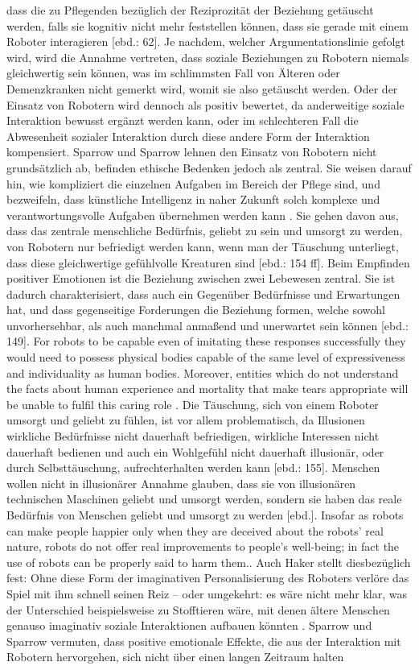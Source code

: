 dass die zu Pflegenden bezüglich der Reziprozität der Beziehung getäuscht werden, falls sie kognitiv nicht mehr feststellen können, dass sie gerade mit einem Roboter interagieren [ebd.: 62]. Je nachdem, welcher Argumentationslinie gefolgt wird, wird die Annahme vertreten, dass soziale Beziehungen zu Robotern niemals gleichwertig sein können, was im schlimmsten Fall von Älteren oder Demenzkranken nicht gemerkt wird, womit sie also getäuscht werden. Oder der Einsatz von Robotern wird dennoch als positiv bewertet, da anderweitige soziale Interaktion bewusst ergänzt werden kann, oder im schlechteren Fall die Abwesenheit sozialer Interaktion durch diese andere Form der Interaktion kompensiert. Sparrow und Sparrow lehnen den Einsatz von Robotern nicht grundsätzlich ab, befinden ethische Bedenken jedoch als zentral. Sie weisen darauf hin, wie kompliziert die einzelnen Aufgaben im Bereich der Pflege sind, und bezweifeln, dass künstliche Intelligenz in naher Zukunft solch komplexe und verantwortungsvolle Aufgaben übernehmen werden kann \cite[145 ff]{sparrow}. Sie gehen davon aus, dass das zentrale menschliche Bedürfnis, geliebt zu sein und umsorgt zu werden, von Robotern nur befriedigt werden kann, wenn man der Täuschung unterliegt, dass diese gleichwertige gefühlvolle Kreaturen sind [ebd.: 154 ff]. Beim Empfinden positiver Emotionen ist die Beziehung zwischen zwei Lebewesen zentral. Sie ist dadurch charakterisiert, dass auch ein Gegenüber Bedürfnisse und Erwartungen hat, und dass gegenseitige Forderungen die Beziehung formen, welche sowohl unvorhersehbar, als auch manchmal anmaßend und unerwartet sein können [ebd.: 149]. \glqq For robots to be capable even of imitating these responses successfully they would need to possess physical bodies capable of the same level of expressiveness and individuality as human bodies. Moreover, entities which do not understand the facts about human experience and mortality that make tears appropriate will be unable to fulfil this caring role \grqq [ebd.: 154 ff]. Die Täuschung, sich von einem Roboter umsorgt und geliebt zu fühlen, ist vor allem problematisch, da Illusionen wirkliche Bedürfnisse nicht dauerhaft befriedigen, wirkliche Interessen nicht dauerhaft bedienen und auch ein Wohlgefühl nicht dauerhaft illusionär, oder durch Selbsttäuschung, aufrechterhalten werden kann [ebd.: 155]. Menschen wollen nicht in illusionärer Annahme glauben, dass sie von illusionären technischen Maschinen geliebt und umsorgt werden, sondern sie haben das reale Bedürfnis von Menschen geliebt und umsorgt zu werden [ebd.]. \glqq Insofar as robots can make people happier only when they are deceived about the robots’ real nature, robots do not offer real improvements to people’s well-being; in fact the use of robots can be properly said to harm them.\grqq[ebd.]. Auch Haker stellt diesbezüglich fest: \glqq Ohne diese Form der imaginativen Personalisierung des Roboters verlöre das Spiel mit ihm schnell seinen Reiz – oder umgekehrt: es wäre nicht mehr klar, was der Unterschied beispielsweise zu Stofftieren wäre, mit denen ältere Menschen genauso imaginativ soziale Interaktionen aufbauen könnten \grqq \cite[59]{haker}. Sparrow und Sparrow vermuten, dass positive emotionale Effekte, die aus der Interaktion mit Robotern hervorgehen, sich nicht über einen langen Zeitraum halten 